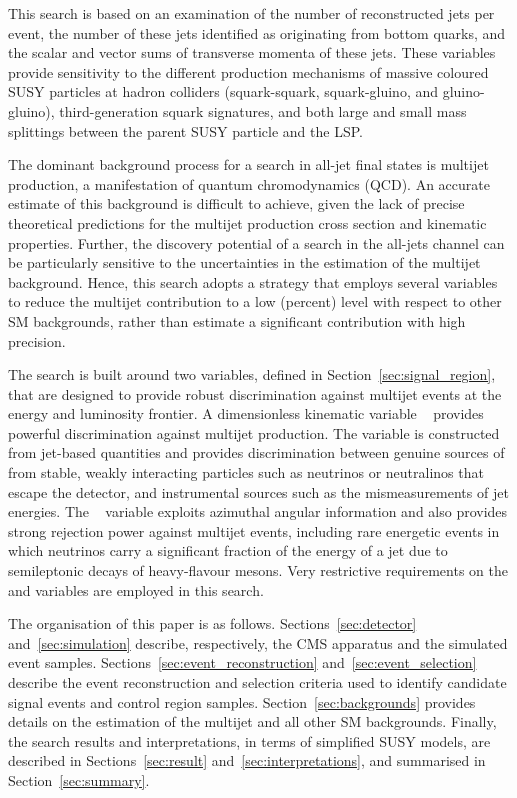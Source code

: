 This search is based on an examination of the number of reconstructed
jets per event, the number of these jets identified as originating
from bottom quarks, and the scalar and vector sums of transverse
momenta of these jets. These variables provide sensitivity to the
different production mechanisms of massive coloured SUSY particles at
hadron colliders (\ie squark-squark, squark-gluino, and
gluino-gluino), third-generation squark signatures, and both large and
small mass splittings between the parent SUSY particle and the LSP.

The dominant background process for a search in all-jet final states
is multijet production, a manifestation of quantum chromodynamics
(QCD). An accurate estimate of this background is difficult to
achieve, given the lack of precise theoretical predictions for the
multijet production cross section and kinematic properties. Further,
the discovery potential of a search in the all-jets channel can be
particularly sensitive to the uncertainties in the estimation of the
multijet background. Hence, this search adopts a strategy that employs
several variables to reduce the multijet contribution to a low
(percent) level with respect to other SM backgrounds, rather than
estimate a significant contribution with high precision.

The search is built around two variables, defined in
Section~\ref{sec:signal_region}, that are designed to provide robust
discrimination against multijet events at the energy and luminosity
frontier. A dimensionless kinematic variable
\alphat~\cite{Randall:2008rw, RA1Paper} provides powerful
discrimination against multijet production. The \alphat variable is
constructed from jet-based quantities and provides discrimination
between genuine sources of \ptvecmiss from stable, weakly interacting
particles such as neutrinos or neutralinos that escape the detector,
and instrumental sources such as the mismeasurements of jet energies.
The \bdphi~\cite{RA1Paper} variable exploits azimuthal angular
information and also provides strong rejection power against multijet
events, including rare energetic events in which neutrinos carry a
significant fraction of the energy of a jet due to semileptonic decays
of heavy-flavour mesons. Very restrictive requirements on the \alphat
and \dphi variables are employed in this search.

The organisation of this paper is as
follows. Sections~\ref{sec:detector} and~\ref{sec:simulation}
describe, respectively, the CMS apparatus and the simulated event
samples. Sections~\ref{sec:event_reconstruction}
and~\ref{sec:event_selection} describe the event reconstruction and
selection criteria used to identify candidate signal events and
control region samples. Section~\ref{sec:backgrounds} provides details
on the estimation of the multijet and all other SM
backgrounds. Finally, the search results and interpretations, in terms
of simplified SUSY models, are described in
Sections~\ref{sec:result} and~\ref{sec:interpretations}, and
summarised in Section~\ref{sec:summary}.


